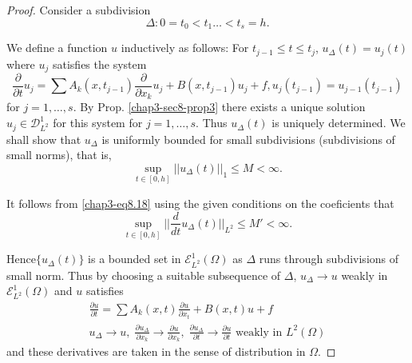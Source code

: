 \begin{proof}
Consider a subdivision
$$
\Delta : 0 = t_0 < t_1 \ldots < t_s = h. 
$$

We define a function $u$ inductively as follows: For $t_{j-1} \leq t
\leq t_j$, $u_{\Delta}(t) = u_j (t)$ where $u_j$ satisfies the system  
\begin{equation*} 
\frac{\partial}{\partial t} u_j = \sum A_k (x, t_{j-1})
\frac{\partial}{\partial x_k} u_j + B(x, t_{j-1}) u_j + f,
u_j(t_{j-1}) = u_{j-1} (t_{j-1}) \tag{8.18} \label{chap3-eq8.18}
\end{equation*}
for $j = 1, \ldots, s$. By Prop. \ref{chap3-sec8-prop3} there exists a
unique solution $u_j 
\in \mathscr{D}^1_{L^2}$ for this system for $j = 1, \ldots,
s$. Thus $u_{\Delta}(t)$ is uniquely determined. We shall show that
$u_{\Delta}$ is uniformly bounded for small subdivisions (subdivisions
of small norms), that is, 
$$
\sup\limits_{t \in [0, h]}|| u_{\Delta} (t) ||_1 \leq M <
\infty. 
$$

It follows from \eqref{chap3-eq8.18} using the given conditions on the
coeficients that  
$$
\sup\limits_{t \in [0, h]}|| \frac{d}{dt} u_{\Delta} (t)
||_{L^2} \leq M' < \infty. 
$$

Hence\pageoriginale $\{ u_{\Delta} (t) \}$ is a bounded set in
$\mathscr{E}^{1}_{L^2} (\Omega)$ as $\Delta$ runs through subdivisions
of small norm. Thus by choosing a suitable subsequence of $\Delta$,
$u_{\Delta} \to u$ weakly in $\mathscr{E}^{1}_{L^2} (\Omega)$ and $u$
satisfies  
\begin{gather*}
\frac{\partial u}{\partial t} = \sum A_k (x, t) \frac{\partial
  u}{\partial x_t} + B(x, t) u+f \tag{8.18}\label{chap3-eq8.18}\\ 
u_{\Delta} \to u, \; \frac{\partial u_{\Delta}}{\partial x_k} \to
\frac{\partial u}{\partial x_k}, \; \frac{\partial u_{\Delta}}{\partial
  t} \to \frac{\partial u}{\partial t} \text{ weakly in } L^2(\Omega ) 
\end{gather*}
and these derivatives are taken in the sense of distribution in
$\Omega$. 


\end{proof}
